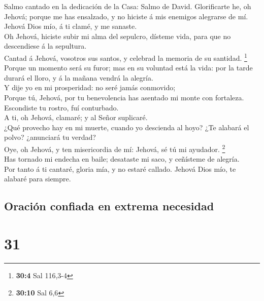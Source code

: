  Salmo cantado en la dedicación de la Casa: Salmo de David.
Glorificarte he, oh Jehová; porque me has ensalzado, y no hiciste á mis
enemigos alegrarse de mí.\\
 Jehová Dios mío, á ti clamé, y me sanaste.\\
 Oh Jehová, hiciste subir mi alma del sepulcro, dísteme
vida, para que no descendiese á la sepultura.\\
 Cantad á Jehová, vosotros sus santos, y celebrad la memoria
de su santidad. \footnote{\textbf{30:4} Sal 116,3-4}\\
 Porque un momento será su furor; mas en su voluntad está la
vida: por la tarde durará el lloro, y á la mañana vendrá la alegría.\\
 Y dije yo en mi prosperidad: no seré jamás conmovido;\\
 Porque tú, Jehová, por tu benevolencia has asentado mi
monte con fortaleza. Escondiste tu rostro, fuí conturbado.\\
 A ti, oh Jehová, clamaré; y al Señor suplicaré.\\
 ¿Qué provecho hay en mi muerte, cuando yo descienda al
hoyo? ¿Te alabará el polvo? ¿anunciará tu verdad?\\
 Oye, oh Jehová, y ten misericordia de mí: Jehová, sé tú mi
ayudador. \footnote{\textbf{30:10} Sal 6,6}\\
 Has tornado mi endecha en baile; desataste mi saco, y
ceñísteme de alegría.\\
 Por tanto á ti cantaré, gloria mía, y no estaré callado.
Jehová Dios mío, te alabaré para siempre.

\hypertarget{oraciuxf3n-confiada-en-extrema-necesidad}{%
\subsection{Oración confiada en extrema
necesidad}\label{oraciuxf3n-confiada-en-extrema-necesidad}}

\hypertarget{section-30}{%
\section{31}\label{section-30}}

